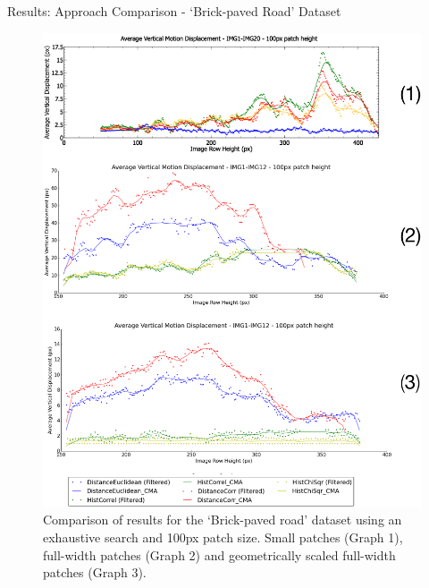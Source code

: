\documentclass[10pt, compress]{beamer}
\begin{document}
\begin{frame}{Results: Approach Comparison - `Brick-paved Road' Dataset}

\begin{figure}[ht!]
\centering
\vspace{-0.5cm}
\includegraphics[scale=0.12]{outside_pres_results.png}
\caption{Comparison of results for the `Brick-paved road' dataset using an exhaustive search and 100px patch size. Small patches (Graph 1), full-width patches (Graph 2) and geometrically scaled full-width patches (Graph 3).}
\end{figure}


%
%
%
%
%

\end{frame}
\end{document}
